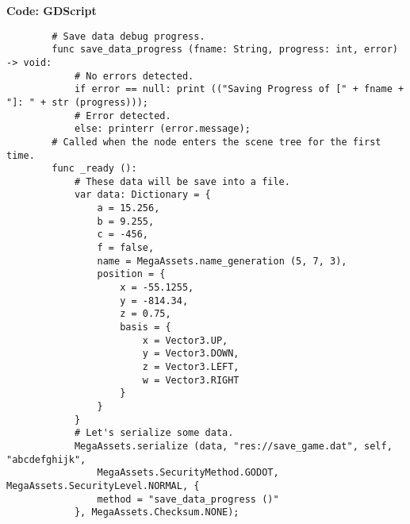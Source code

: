 \documentclass[a4paper, 11pt]{article}
\begin{document}
	\textbf{Code: GDScript}
	\begin{lstlisting}
		# Save data debug progress.
		func save_data_progress (fname: String, progress: int, error) -> void:
			# No errors detected.
			if error == null: print (("Saving Progress of [" + fname + "]: " + str (progress)));
			# Error detected.
			else: printerr (error.message);
		# Called when the node enters the scene tree for the first time.
		func _ready ():
			# These data will be save into a file.
			var data: Dictionary = {
				a = 15.256,
				b = 9.255,
				c = -456,
				f = false,
				name = MegaAssets.name_generation (5, 7, 3),
				position = {
					x = -55.1255,
					y = -814.34,
					z = 0.75,
					basis = {
						x = Vector3.UP,
						y = Vector3.DOWN,
						z = Vector3.LEFT,
						w = Vector3.RIGHT
					}
				}
			}
			# Let's serialize some data.
			MegaAssets.serialize (data, "res://save_game.dat", self, "abcdefghijk", 				
				MegaAssets.SecurityMethod.GODOT, MegaAssets.SecurityLevel.NORMAL, {
				method = "save_data_progress ()"
			}, MegaAssets.Checksum.NONE);
	\end{lstlisting}
\end{document}
